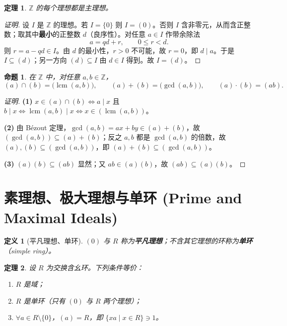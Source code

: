 \documentclass[11pt,a4paper]{ctexart}
\newtheorem*{theorem}{定理}
\newtheorem*{definition}{定义}
\newtheorem*{proposition}{命题}
\theoremstyle{remark}
\DeclareMathOperator{\lcm}{lcm}
\begin{document}
\begin{theorem}
$\mathbb{Z}$ 的每个理想都是主理想。
\end{theorem}

\begin{proof}[证明]
设 $I$ 是 $\mathbb{Z}$ 的理想。若 $I=\{0\}$ 则 $I=(0)$。否则 $I$ 含非零元，从而含正整数；取其中\textbf{最小}的正整数 $d$（良序性）。对任意 $a\in I$ 作带余除法
\[
a=qd+r,\qquad 0\le r<d .
\]
则 $r=a-qd\in I$。由 $d$ 的最小性，$r>0$ 不可能，故 $r=0$，即 $d\mid a$。于是 $I\subseteq(d)$；另一方向 $(d)\subseteq I$ 由 $d\in I$ 得到。故 $I=(d)$。
\end{proof}

\begin{proposition}
在 $\mathbb{Z}$ 中，对任意 $a,b\in\mathbb{Z}$，
\[
(a)\cap(b)=\bigl(\lcm(a,b)\bigr),\qquad
(a)+(b)=\bigl(\gcd(a,b)\bigr),\qquad
(a)\cdot(b)=(ab).
\]
\end{proposition}

\begin{proof}[证明]
\textbf{(1)} $x\in(a)\cap(b)\iff a\mid x$ 且 $b\mid x \iff \lcm(a,b)\mid x \iff x\in(\lcm(a,b))$。

\textbf{(2)} 由 Bézout 定理，$\gcd(a,b)=ax+by\in(a)+(b)$，故 $(\gcd(a,b))\subseteq(a)+(b)$；反之 $a,b$ 都是 $\gcd(a,b)$ 的倍数，故 $(a),(b)\subseteq(\gcd(a,b))$，即 $(a)+(b)\subseteq(\gcd(a,b))$。

\textbf{(3)} $(a)(b)\subseteq(ab)$ 显然；又 $ab\in(a)(b)$，故 $(ab)\subseteq(a)(b)$。
\end{proof}

\section*{素理想、极大理想与单环 (Prime and Maximal Ideals)}

\begin{definition}[平凡理想、单环]
$(0)$ 与 $R$ 称为\textbf{平凡理想}；不含其它理想的环称为\textbf{单环}（simple ring）。
\end{definition}

\begin{theorem}
设 $R$ 为交换含幺环。下列条件等价：
\begin{enumerate}
    \item $R$ 是域；
    \item $R$ 是单环（只有 $(0)$ 与 $R$ 两个理想）；
    \item $\forall a\in R\setminus\{0\}$，$(a)=R$，即 $\{xa\mid x\in R\}\ni 1$。
\end{enumerate}
\end{theorem}
\end{document}
